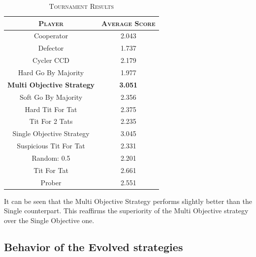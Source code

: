 \documentclass[a4paper]{article}
\begin{document}
	\begin{table}[H]
	  \begin{center}
	    \begin{tabular}{c|c}
	      \toprule
	      \textsc{Player} & \textsc{Average Score}\\
	      \midrule
			Cooperator & 2.043\\
			Defector & 1.737\\
			Cycler CCD & 2.179\\
			Hard Go By Majority & 1.977\\
			\textbf{Multi Objective Strategy} & \textbf{3.051}\\
			Soft Go By Majority & 2.356\\
			Hard Tit For Tat & 2.375\\
			Tit For 2 Tats & 2.235\\
			{Single Objective Strategy} & {3.045}\\
			Suspicious Tit For Tat & 2.331\\
			Random: 0.5 & 2.201\\
			Tit For Tat & 2.661\\
			Prober & 2.551\\
		  \bottomrule
	    \end{tabular}
	    \caption{\textsc{Tournament Results}}
	  \end{center}
	\end{table}  

	It can be seen that the Multi Objective Strategy performs slightly better than the Single counterpart. This reaffirms the superiority of the Multi Objective strategy over the Single Objective one.
		
	\subsection{Behavior of the Evolved strategies}
\end{document}
